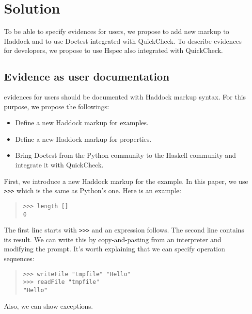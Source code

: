 \documentclass[preprint]{sigplanconf}
\begin{document}
\section{Solution}

To be able to specify evidences for users, we propose to add new
markup to Haddock and to use Doctest integrated with QuickCheck. To
describe evidences for developers, we propose to use Hspec also
integrated with QuickCheck.

\subsection{Evidence as user documentation}
\label{sec:for-users}

evidences for users should be documented with Haddock markup syntax.
For this purpose, we propose the followings:

\begin{itemize}
\item Define a new Haddock markup for examples.
\item Define a new Haddock markup for properties.
\item Bring Doctest from the Python community to the Haskell
community and integrate it with QuickCheck.
\end{itemize}

\noindent First, we introduce a new Haddock markup for the example.
In this paper, we use {\tt >>>} which is the same as Python's one.
Here is an example:

\begin{quote}
\small
\begin{verbatim}
>>> length []
0
\end{verbatim}
\end{quote}

\noindent The first line starts with {\tt >>>} and an expression follows. The second line contains its result. We can write this by copy-and-pasting from an interpreter and modifying the prompt.
It's worth explaining that we can specify operation sequences:

\begin{quote}
\small
\begin{verbatim}
>>> writeFile "tmpfile" "Hello"
>>> readFile "tmpfile"
"Hello"
\end{verbatim}
\end{quote}

\noindent Also, we can show exceptions.
\end{document}
